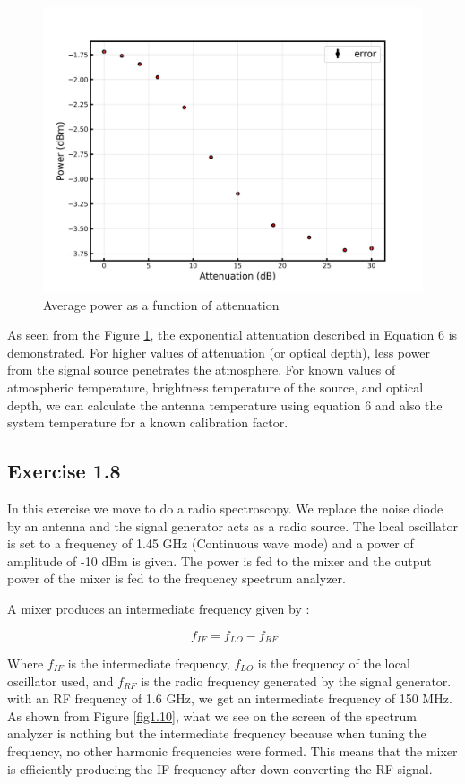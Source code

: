 \documentclass[12pt]{article}
\begin{document}
\begin{figure}[H]
\centering
\includegraphics[scale=.5]{fig/Exercise 1.7.jpg}
\caption{Average power as a function of attenuation}
\label{fig1.9}
\end{figure}

As seen from the Figure \ref{fig1.9}, the exponential attenuation described in Equation 6 is demonstrated. For higher values of attenuation (or optical depth), less power from the signal source penetrates the atmosphere. 
For known values of atmospheric temperature, brightness temperature of the source, and optical depth, we can calculate the antenna temperature using equation 6 and also the system temperature for a known calibration factor. 

\subsection{Exercise 1.8}
In this exercise we move to do a radio spectroscopy. We replace the noise diode by an antenna and the signal generator acts as a radio source. The local oscillator is set to a frequency of 1.45 GHz (Continuous wave mode) and a power of amplitude of -10 dBm is given. The power is fed to the mixer and the output power of the mixer is fed to the frequency spectrum analyzer. 

A mixer produces an intermediate frequency given by \cite{klein}:

\begin{equation}
\ f_{IF} = f_{LO} - f_{RF}
\end{equation}

Where $f_{IF}$ is the intermediate frequency, $f_{LO}$ is the frequency of the local oscillator used, and $f_{RF}$ is the radio frequency generated by the signal generator. 
with an RF frequency of 1.6 GHz, we get an intermediate frequency of 150 MHz. 
As shown from Figure \ref{fig1.10}, what we see on the screen of the spectrum analyzer is nothing but the intermediate frequency because when tuning the frequency, no other harmonic frequencies were formed. This means that the mixer is efficiently producing the IF frequency after down-converting the RF signal. 
\end{document}
